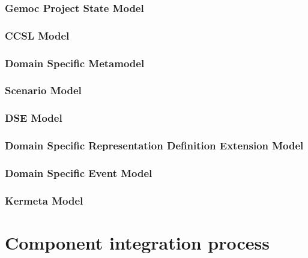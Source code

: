 \documentclass{gemoc} %
\begin{document}

\subsection{Gemoc Project State Model}


\subsection{CCSL Model}


\subsection{Domain Specific Metamodel}


\subsection{Scenario Model}


\subsection{DSE Model}


\subsection{Domain Specific Representation Definition Extension Model}


\subsection{Domain Specific Event Model}


\subsection{Kermeta Model}



\chapter{Component integration process}

\end{document}
